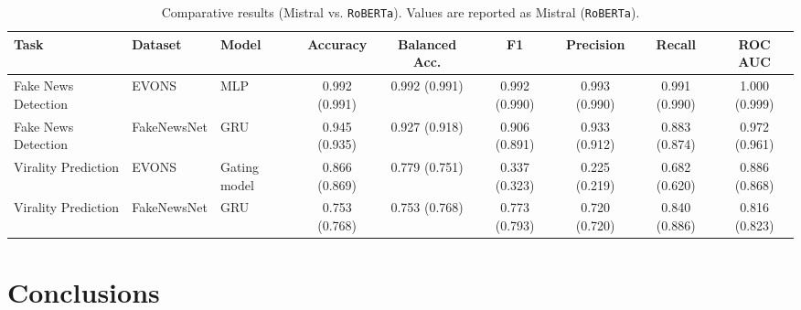 \documentclass[a4paper,twoside,12pt]{book}
\begin{document}
\begin{table}
	\centering
	\caption{Comparative results (Mistral vs. \texttt{RoBERTa}). Values are reported as Mistral (\texttt{RoBERTa}).}
	\label{tab:results_mistral_bert}
	\begin{tabular}{lllcccccc}
		\toprule
		\textbf{Task} & \textbf{Dataset} & \textbf{Model} & \textbf{Accuracy} & \textbf{Balanced Acc.} & \textbf{F1} & \textbf{Precision} & \textbf{Recall} & \textbf{ROC AUC} \\
		\midrule
		Fake News Detection & EVONS       & MLP    & 0.992 (0.991) & 0.992 (0.991) & 0.992 (0.990) & 0.993 (0.990) & 0.991 (0.990) & 1.000 (0.999) \\
		Fake News Detection & FakeNewsNet & GRU    & 0.945 (0.935) & 0.927 (0.918) & 0.906 (0.891) & 0.933 (0.912) & 0.883 (0.874) & 0.972 (0.961) \\
		Virality Prediction & EVONS       & Gating model & 0.866 (0.869) & 0.779 (0.751) & 0.337 (0.323) & 0.225 (0.219) & 0.682 (0.620) & 0.886 (0.868) \\
		Virality Prediction & FakeNewsNet & GRU    & 0.753 (0.768) & 0.753 (0.768) & 0.773 (0.793) & 0.720 (0.720) & 0.840 (0.886) & 0.816 (0.823) \\
		\bottomrule
	\end{tabular}
\end{table}


\chapter{Conclusions}
\end{document}
